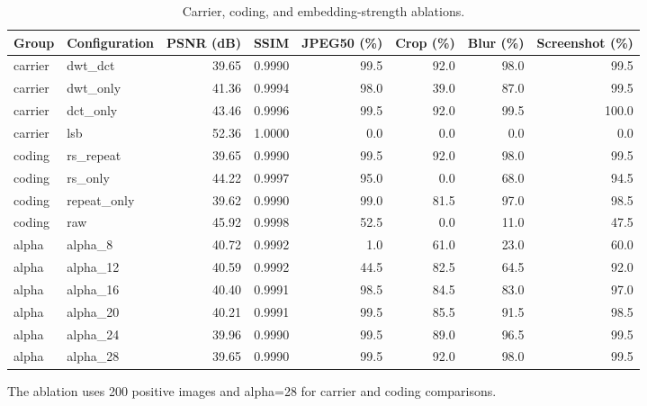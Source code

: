 \begin{table}[t]
\centering
\caption{Carrier, coding, and embedding-strength ablations.}
\label{tab:ablation}
\begin{tabular}{l l r r r r r r}
\toprule
Group & Configuration & PSNR (dB) & SSIM & JPEG50 (\%) & Crop (\%) & Blur (\%) & Screenshot (\%) \\
\midrule
carrier & dwt\_dct & 39.65 & 0.9990 & 99.5 & 92.0 & 98.0 & 99.5 \\
carrier & dwt\_only & 41.36 & 0.9994 & 98.0 & 39.0 & 87.0 & 99.5 \\
carrier & dct\_only & 43.46 & 0.9996 & 99.5 & 92.0 & 99.5 & 100.0 \\
carrier & lsb & 52.36 & 1.0000 & 0.0 & 0.0 & 0.0 & 0.0 \\
coding & rs\_repeat & 39.65 & 0.9990 & 99.5 & 92.0 & 98.0 & 99.5 \\
coding & rs\_only & 44.22 & 0.9997 & 95.0 & 0.0 & 68.0 & 94.5 \\
coding & repeat\_only & 39.62 & 0.9990 & 99.0 & 81.5 & 97.0 & 98.5 \\
coding & raw & 45.92 & 0.9998 & 52.5 & 0.0 & 11.0 & 47.5 \\
alpha & alpha\_8 & 40.72 & 0.9992 & 1.0 & 61.0 & 23.0 & 60.0 \\
alpha & alpha\_12 & 40.59 & 0.9992 & 44.5 & 82.5 & 64.5 & 92.0 \\
alpha & alpha\_16 & 40.40 & 0.9991 & 98.5 & 84.5 & 83.0 & 97.0 \\
alpha & alpha\_20 & 40.21 & 0.9991 & 99.5 & 85.5 & 91.5 & 98.5 \\
alpha & alpha\_24 & 39.96 & 0.9990 & 99.5 & 89.0 & 96.5 & 99.5 \\
alpha & alpha\_28 & 39.65 & 0.9990 & 99.5 & 92.0 & 98.0 & 99.5 \\
\bottomrule
\end{tabular}
\par\smallskip
\footnotesize The ablation uses 200 positive images and alpha=28 for carrier and coding comparisons.
\end{table}
